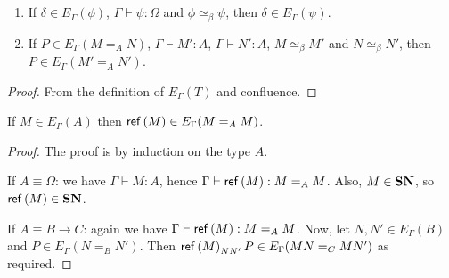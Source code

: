 {\begin{code}
\\
\>[11]\<[19]%
\>[19]   \AgdaSymbol{(} \AgdaSymbol{:}   \AgdaSymbol{)} \AgdaSymbol{(} \AgdaSymbol{:}  \AgdaSymbol{)}                   \AgdaSymbol{(} \AgdaSymbol{(}   \AgdaSymbol{)} \AgdaSymbol{))} \<%
\\
\>[11]\<[19]%
\>[19]  \AgdaSymbol{(}  \AgdaSymbol{)} \<%
\end{code}
}

\begin{lm}$ $
\label{lm:conv-compute}
\begin{enumerate}
\item
If $\delta \in E_\Gamma(\phi)$, $\Gamma \vdash \psi : \Omega$ and $\phi \simeq_\beta \psi$, then $\delta \in E_\Gamma(\psi)$.
\item
If $P \in E_\Gamma(M =_A N)$, $\Gamma \vdash M' : A$, $\Gamma \vdash N' : A$, $M \simeq_\beta M'$ and $N \simeq_\beta N'$,
then $P \in E_\Gamma(M' =_A N')$.
\end{enumerate}
\end{lm}

\begin{proof}
From the definition of $E_\Gamma(T)$ and confluence.
\end{proof}

\begin{lm}
\label{lm:Eref}
If $M \in E_\Gamma(A)$ then $\mathsf{ref} \left( {M} \right) \in E_\Gamma(M =_A M)$.
\end{lm}

\begin{proof}
The proof is by induction on the type $A$.

If $A \equiv \Omega$: we have $\Gamma \vdash M : A$, hence $\Gamma \vdash \mathsf{ref} \left( {M} \right) : M =_A M$.  Also,
$M \in \mathbf{SN}$, so $\mathsf{ref} \left( {M} \right) \in \mathbf{SN}$.

If $A \equiv B \rightarrow C$: again we have $\Gamma \vdash \mathsf{ref} \left( {M} \right) : M =_A M$.  Now, let $N, N' \in E_\Gamma(B)$
and $P \in E_\Gamma(N =_B N')$.  Then $\mathsf{ref} \left( {M} \right)_{N N'} P \in E_\Gamma(MN =_C MN')$ as required.
\end{proof}

